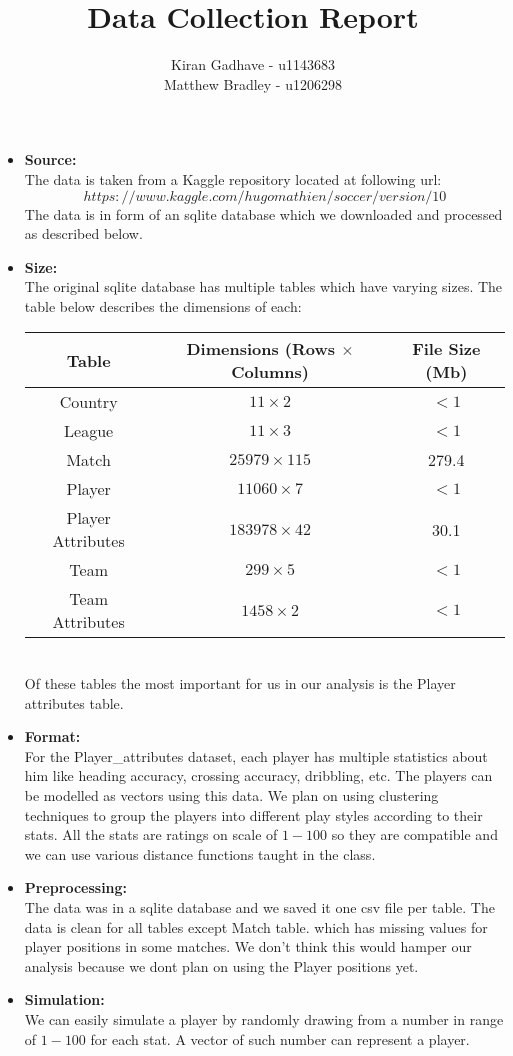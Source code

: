 \documentclass[11pt]{extarticle}
\title{Data Collection Report}
\author{Kiran Gadhave - u1143683\\Matthew Bradley - u1206298}
\newcommand{\<}{\langle}
\renewcommand{\>}{\rangle}
\theoremstyle{definition}
\begin{document}
\maketitle

\begin{itemize}

	\item \textbf{Source:}\\
	The data is taken from a Kaggle repository located at following url: 
	$$https://www.kaggle.com/hugomathien/soccer/version/10 $$
	The data is in form of an sqlite database which we downloaded and processed as described below.
	\item \textbf{Size:}\\
	The original sqlite database has multiple tables which have varying sizes. The table below describes the dimensions of each:
	\begin{table}[h!]
		\begin{center}
			\begin{tabular}{c|c|c}
				\textbf{Table} & \textbf{Dimensions (Rows $\times$ Columns)} & \textbf{File Size (Mb)} \\
				\hline
				Country & $11 \times 2$ & $<1$\\
				League & $11 \times 3$ & $<1$\\
				Match & $25979 \times 115$ & 279.4\\
				Player & $11060 \times 7$ & $<1$\\
				Player Attributes & $183978 \times 42$ & 30.1\\
				Team & $299 \times 5$ & $<1$\\
				Team Attributes & $1458 \times 2$ & $<1$\\
			\end{tabular}
		\end{center}
	\end{table}
	\\
	Of these tables the most important for us in our analysis is the Player attributes table.
	\item \textbf{Format:}\\
	For the Player\_attributes dataset, each player has multiple statistics about him like heading accuracy, crossing accuracy, dribbling, etc. The players can be modelled as vectors using this data. We plan on using clustering techniques to group the players into different play styles according to their stats. All the stats are ratings on scale of $1-100$ so they are compatible and we can use various distance functions taught in the class.
	\item \textbf{Preprocessing:}\\
	The data was in a sqlite database and we saved it one csv file per table. The data is clean for all tables except Match table. which has missing values for player positions in some matches. We don't think this would hamper our analysis because we dont plan on using the Player positions yet.
	\item \textbf{Simulation:}\\
	We can easily simulate a player by randomly drawing from a number in range of $1-100$ for each stat. A vector of such number can represent a player.
\end{itemize}
\end{document}
